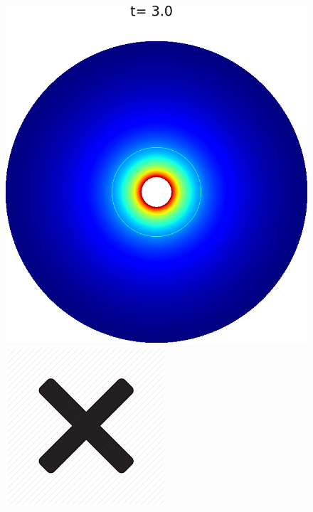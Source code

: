 \documentclass[preprint, 11pt]{article}
\begin{document}
\begin{figure}[!h]
  \centering 
  \includegraphics[scale=0.28]{figures/chj_r1_llf_p3.png} \quad
  \includegraphics[scale=0.5]{figures/cross.png} \quad

\end{figure}
\end{document}

